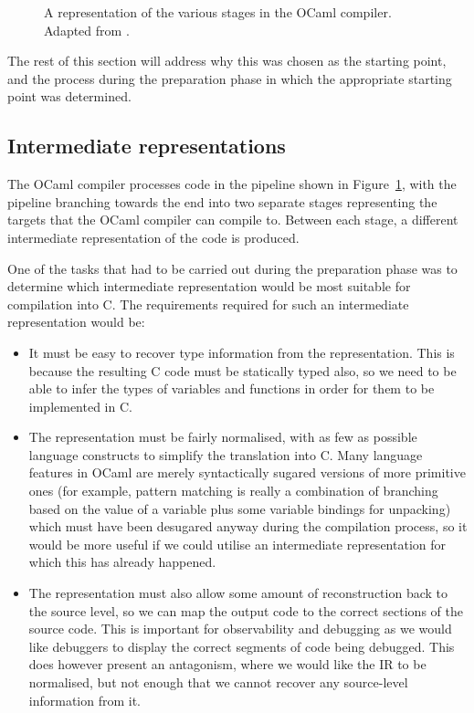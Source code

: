 \begin{figure}
    \centering
    
    \caption{A representation of the various stages in the OCaml compiler. 
    Adapted from \cite[Chapter~22]{realworldocaml}.}\label{fig:compilerstages}
\end{figure}

The rest of this section will address why this was chosen as the starting 
point, and the process during the preparation phase in which the appropriate 
starting point was determined.

\subsection{Intermediate representations}

The OCaml compiler processes code in the pipeline shown in
Figure~\ref{fig:compilerstages}, with the pipeline branching towards the end
into two separate stages representing the targets that the OCaml compiler can
compile to. Between each stage, a different intermediate representation of the
code is produced.

One of the tasks that had to be carried out during the preparation phase was 
to determine which intermediate representation would be most suitable for 
compilation into C. The requirements required for such an intermediate 
representation would be:

\begin{itemize}

\item It must be easy to recover type information from the representation. This
    is because the resulting C code must be statically typed also, so we need to
    be able to infer the types of variables and functions in order for them to
    be implemented in C.

\item The representation must be fairly normalised, with as few as possible
    language constructs to simplify the translation into C. Many language
    features in OCaml are merely syntactically sugared versions of more
    primitive ones (for example, pattern matching is really a combination of
    branching based on the value of a variable plus some variable bindings for
    unpacking) which must have been desugared anyway during the compilation
    process, so it would be more useful if we could utilise an intermediate
    representation for which this has already happened.

\item The representation must also allow some amount of reconstruction back to
    the source level, so we can map the output code to the correct sections of
    the source code. This is important for observability and debugging as we
    would like debuggers to display the correct segments of code being debugged.
    This does however present an antagonism, where we would like the IR to be
    normalised, but not enough that we cannot recover any source-level
    information from it.

\end{itemize}


